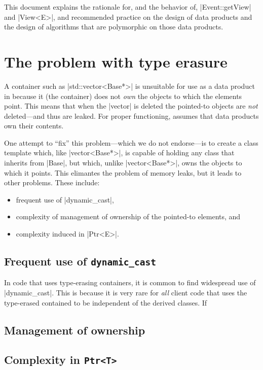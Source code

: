 \documentclass[screen]{memarticle}
\newcommand{\art}{\name{art}\xspace}
\begin{document}
This document explains the rationale for, and the behavior of,
|Event::getView| and |View<E>|, and recommended practice on the design
of data products and the design of algorithms that are polymorphic on
those data products.

\chapter{The problem with type erasure}

A container such as |std::vector<Base*>| is unsuitable for use as a
data product in \art because it (the container) does not \emph{own}
the objects to which the elements point. This means that when the
|vector| is deleted the pointed-to objects are \emph{not}
deleted---and thus are leaked. For proper functioning, \art assumes
that data products own their contents.

One attempt to ``fix'' this problem---which we do not endorse---is to
create a class template which, like |vector<Base*>|, is capable of
holding any class that inherits from |Base|, but which, unlike
|vector<Base*>|, owns the objects to which it points. This elimantes
the problem of memory leaks, but it leads to other problems. These
include:
\begin{itemize}
\item frequent use of |dynamic_cast|,
\item complexity of management of ownership of the pointed-to elements, and
\item complexity induced in |Ptr<E>|.
\end{itemize}

\section{Frequent use of \lstinline{dynamic_cast}}

In code that uses type-erasing containers, it is common to find
widespread use of |dynamic_cast|. This is because it is very rare for
\emph{all} client code that uses the type-erased contained to be
independent of the derived classes. If


\section{Management of ownership}
\section{Complexity in \lstinline{Ptr<T>}}
\end{document}
